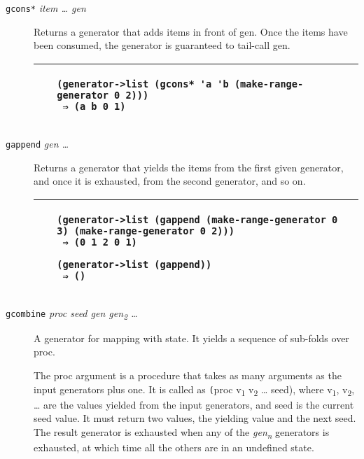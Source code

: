 \begin{description}
\item[\texttt{gcons*} \emph{item \ldots{} gen}]
Returns a generator that adds items in front of gen. Once the items have
been consumed, the generator is guaranteed to tail-call gen.

\begin{longtable}[]{@{}ll@{}}
\toprule
\begin{minipage}[t]{0.47\columnwidth}\raggedright\strut
~\strut
\end{minipage} & \begin{minipage}[t]{0.47\columnwidth}\raggedright\strut
\begin{verbatim}
(generator->list (gcons* 'a 'b (make-range-generator 0 2)))
 ⇒ (a b 0 1)
\end{verbatim}
\strut
\end{minipage}\tabularnewline
\bottomrule
\end{longtable}
\end{description}

\begin{description}
\item[\texttt{gappend} \emph{gen \ldots{}}]
Returns a generator that yields the items from the first given
generator, and once it is exhausted, from the second generator, and so
on.

\begin{longtable}[]{@{}ll@{}}
\toprule
\begin{minipage}[t]{0.47\columnwidth}\raggedright\strut
~\strut
\end{minipage} & \begin{minipage}[t]{0.47\columnwidth}\raggedright\strut
\begin{verbatim}
(generator->list (gappend (make-range-generator 0 3) (make-range-generator 0 2)))
 ⇒ (0 1 2 0 1)

(generator->list (gappend))
 ⇒ ()
\end{verbatim}
\strut
\end{minipage}\tabularnewline
\bottomrule
\end{longtable}
\end{description}

\begin{description}
\item[\texttt{gcombine} \emph{proc seed gen gen\textsubscript{2}
\ldots{}}]
A generator for mapping with state. It yields a sequence of sub-folds
over proc.

The proc argument is a procedure that takes as many arguments as the
input generators plus one. It is called as \texttt{(}proc
v\textsubscript{1} v\textsubscript{2} \ldots{} seed), where
v\textsubscript{1}, v\textsubscript{2}, \ldots{} are the values yielded
from the input generators, and seed is the current seed value. It must
return two values, the yielding value and the next seed. The result
generator is exhausted when any of the \emph{gen\textsubscript{n}}
generators is exhausted, at which time all the others are in an
undefined state.
\end{description}

